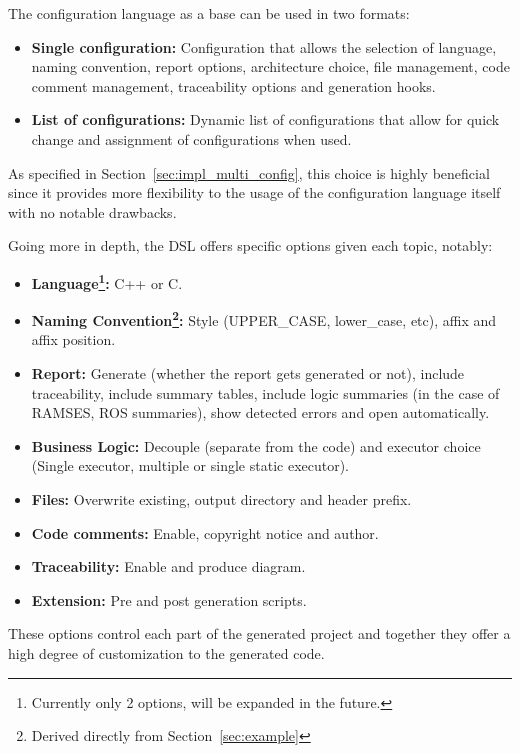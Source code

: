 The configuration language as a base can be used in two formats:

\begin{itemize}  
	\item \textbf{Single configuration: } Configuration that allows the selection of language, naming convention, report options, architecture choice, file management, code comment management, traceability options and generation hooks.
	\item \textbf{List of configurations: } Dynamic list of configurations that allow for quick change and assignment of configurations when used.
\end{itemize}


As specified in Section~\ref{sec:impl_multi_config}, this choice is highly beneficial since it provides more flexibility to the usage of the configuration language itself with no notable drawbacks.

Going more in depth, the \gls{DSL} offers specific options given each topic, notably:

\begin{itemize}  
	\item \textbf{Language\footnote{Currently only 2 options, will be expanded in the future.}: } C++ or C.
	\item \textbf{Naming Convention\footnote{Derived directly from Section~\ref{sec:example}}: } Style (UPPER\_CASE, lower\_case, etc), affix and affix position.
	\item \textbf{Report: } Generate (whether the report gets generated or not), include traceability, include summary tables, include logic summaries (in the case of \gls{RAMSES}, \gls{ROS} summaries), show detected errors and open automatically.
	\item \textbf{Business Logic: } Decouple (separate from the code) and executor choice (Single executor, multiple or single static executor).
	\item \textbf{Files: } Overwrite existing, output directory and header prefix.
	\item \textbf{Code comments: } Enable, copyright notice and author.
	\item \textbf{Traceability: } Enable and produce diagram.
	\item \textbf{Extension: } Pre and post generation scripts.
\end{itemize}

These options control each part of the generated project and together they offer a high degree of customization to the generated code. 

